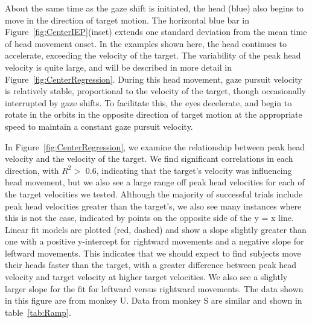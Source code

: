 \documentclass[12pt]{article}
\begin{document}
About the same time as the gaze shift is initiated, the head (blue) also begins to move in the direction of target motion. The horizontal blue bar in Figure~\ref{fig:CenterIEP}(inset) extends one standard deviation from the mean time of head movement onset. In the examples shown here, the head continues to accelerate, exceeding the velocity of the target. The variability of the peak head velocity is quite large, and will be described in more detail in Figure~\ref{fig:CenterRegression}. During this head movement, gaze pursuit velocity is relatively stable, proportional to the velocity of the target, though occasionally interrupted by gaze shifts. To facilitate this, the eyes decelerate, and begin to rotate in the orbits in the opposite direction of target motion at the appropriate speed to maintain a constant gaze pursuit velocity.  

In Figure~\ref{fig:CenterRegression}, we examine the relationship between peak head velocity and the velocity of the target. We find significant correlations in each direction, with $R^{2}>$ 0.6, indicating that the target’s velocity was influencing head movement, but we also see a large range off peak head velocities for each of the target velocities we tested. Although the majority of successful trials include peak head velocities greater than the target’s, we also see many instances where this is not the case, indicated by points on the opposite side of the y = x line. Linear fit models are plotted (red, dashed) and show a slope slightly greater than one with a positive y-intercept for rightward movements and a negative slope for leftward movements. This indicates that we should expect to find subjects move their heads faster than the target, with a greater difference between peak head velocity and target velocity at higher target velocities. We also see a slightly larger slope for the fit for leftward versus rightward movements. The data shown in this figure are from monkey U. Data from monkey S are similar and shown in table~\ref{tab:Ramp}. 
\end{document}
